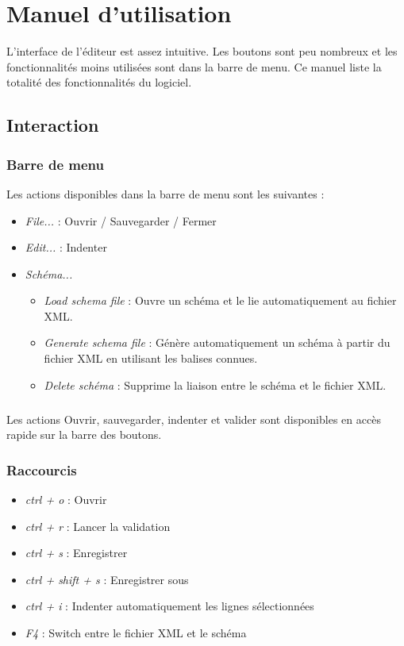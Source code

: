 \chapter{Manuel d'utilisation}

L'interface de l'éditeur est assez intuitive. Les boutons sont peu nombreux et les fonctionnalités moins utilisées sont dans la barre de menu.
Ce manuel liste la totalité des fonctionnalités du logiciel.

\section{Interaction}

\subsection{Barre de menu}


Les actions disponibles dans la barre de menu sont les suivantes :
\begin{itemize}
\item \emph{File...} : Ouvrir / Sauvegarder / Fermer
\item \emph{Edit...} : Indenter
\item \emph{Schéma...}
	\begin{itemize}
	\item \emph{Load schema file} : Ouvre un schéma et le lie automatiquement au fichier XML.
	\item \emph{Generate schema file} : Génère automatiquement un schéma à partir du fichier XML en utilisant les balises connues.
	\item \emph{Delete schéma} : Supprime la liaison entre le schéma et le fichier XML.
	\end{itemize}
\end{itemize}

\paragraph{}
Les actions Ouvrir, sauvegarder, indenter et valider sont disponibles en accès rapide sur la barre des boutons.

\subsection{Raccourcis}
\begin{itemize}
\item \emph{ctrl + o} : Ouvrir
\item \emph{ctrl + r} : Lancer la validation
\item \emph{ctrl + s} : Enregistrer 
\item \emph{ctrl + shift + s} : Enregistrer sous
\item \emph{ctrl + i} : Indenter automatiquement les lignes sélectionnées
\item \emph{F4} : Switch entre le fichier XML et le schéma
\end{itemize}

